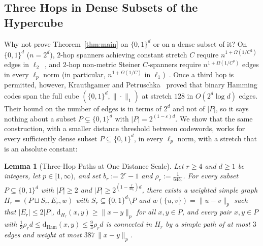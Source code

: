 \documentclass[11pt]{article}
\newtheorem{lemma}[theorem]{Lemma}
\theoremstyle{definition}
\theoremstyle{remark}
\newcommand{\Ham}{\mathrm{Ham}}
\newcommand{\dHam}{\mathrm{d}_{\Ham}}
\begin{document}
\subsection{Three Hops in Dense Subsets of the Hypercube}
\label{subsec:three-hop}

Why not prove Theorem~\ref{thm:main} on $\{0, 1\}^d$ or on a dense subset of it? On $\{0, 1\}^d$ ($n = 2^d$), $2$-hop spanners achieving constant stretch $C$ require $n^{1 + \Omega(1/C^2)}$ edges in $\ell_2$~\cite{harpeled2013euclidean}, and $2$-hop non-metric Steiner $C$-spanners require $n^{1 + \Omega(1/C^p)}$ edges in every $\ell_p$ norm (in particular, $n^{1 + \Omega(1/C)}$ in $\ell_1$)~\cite[Theorem~1.2 and Remark~3.2]{krauthgamer2026towards}. Once a third hop is permitted, however, Krauthgamer and Petruschka~\cite[Theorem~A.1]{krauthgamer2026towards} proved that binary Hamming codes span the full cube $(\{0, 1\}^d, \|\cdot\|_1)$ at stretch $128$ in $O(2^d \log d)$ edges. Their bound on the number of edges is in terms of $2^d$ and not of $|P|$, so it says nothing about a subset $P \subsetneq \{0, 1\}^d$ with $|P| = 2^{(1 - \varepsilon) d}$. We show that the same construction, with a smaller distance threshold between codewords, works for every sufficiently dense subset $P \subseteq \{0, 1\}^d$, in every $\ell_p$ norm, with a stretch that is an absolute constant:

\begin{lemma}[Three-Hop Paths at One Distance Scale]
\label{lem:hamming-layer}
Let $r \ge 4$ and $d \ge 1$ be integers, let $p \in [1, \infty)$, and set $b_r := 2^r - 1$ and $\rho_r := \frac{1}{64 b_r}$. For every subset $P \subseteq \{0, 1\}^d$ with $|P| \ge 2$ and $|P| \ge 2^{(1 - \frac{r}{2 b_r}) d}$, there exists a weighted simple graph $H_r = (P \sqcup S_r, E_r, w)$ with $S_r \subseteq \{0, 1\}^d \setminus P$ and $w(\{u, v\}) = \|u - v\|_p$ such that $|E_r| \le 2|P|$, $\mathrm{d}_{H_r}(x, y) \ge \|x - y\|_p$ for all $x, y \in P$, and every pair $x, y \in P$ with $\frac{1}{3}\rho_r d \le \dHam(x, y) \le \frac{9}{4}\rho_r d$ is connected in $H_r$ by a simple path of at most $3$ edges and weight at most $387\,\|x - y\|_p$.
\end{lemma}
\end{document}
